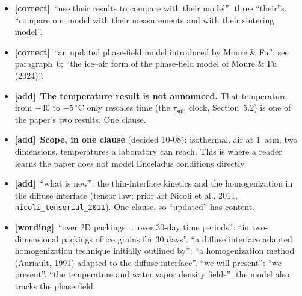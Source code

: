 \documentclass[11pt]{article}
\newcommand{\tC}{\textcolor{miss}{\textbf{[correct]}}\ }
\newcommand{\tG}{\textcolor{stale}{\textbf{[wording]}}\ }
\newcommand{\tA}{\textcolor{have}{\textbf{[add]}}\ }
\begin{document}
\begin{enumerate}
\begin{itemize}
    the second part. Also ``SSA \ldots\ is independent'': it is the relation
    between conductivity and SSA that is independent of temperature, not
    SSA.
  \item \tC ``use their results to compare with their model'': three
    ``their''s. ``compare our model with their measurements and with their
    sintering model''.
  \item \tC ``an updated phase-field model introduced by Moure \& Fu'':
    see paragraph~6; ``the ice--air form of the phase-field model of Moure
    \& Fu (2024)''.
  \item \tA \textbf{The temperature result is not announced.} That
    temperature from $-40$ to $-5\,^{\circ}$C only rescales time (the
    $\tau_{\mathrm{sub}}$ clock, Section~5.2) is one of the paper's two
    results. One clause.
  \item \tA \textbf{Scope, in one clause} (decided 10-08): isothermal, air
    at 1~atm, two dimensions, temperatures a laboratory can reach. This is
    where a reader learns the paper does not model Enceladus conditions
    directly.
  \item \tA ``what is new'': the thin-interface kinetics and the
    homogenization in the diffuse interface (tensor law; prior art Nicoli
    et al., 2011, \texttt{nicoli\_tensorial\_2011}). One clause, so
    ``updated'' has content.
  \item \tG ``over 2D packings \ldots\ over 30-day time periods'': ``in
    two-dimensional packings of ice grains for 30 days''. ``a diffuse
    interface adapted homogenization technique initially outlined by'':
    ``a homogenization method (Auriault, 1991) adapted to the diffuse
    interface''. ``we will present'': ``we present''. ``the temperature and
    water vapor density fields'': the model also tracks the phase field.
  \end{itemize}
\end{enumerate}
\end{document}
